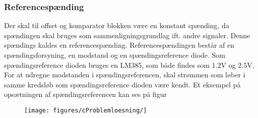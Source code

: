 \subsubsection{Referencespænding}
Der skal til offset og komparator blokken være en konstant spænding, da spændingen skal bruges som sammenligningsgrundlag ift. andre signaler. Denne spændings kaldes en referencespænding. Referencespændingen består af en spændingsforsyning, en modstand og en spændingsreference diode. Som spændingsreference dioden bruges en LM385, som både findes som $1.2$V og $2.5$V. For at udregne modstanden i spændingsreferencen, skal strømmen som løber i samme kredsløb som spændingsreference dioden være kendt. Et eksempel på opsætningen af spændingsreferencen kan ses på figur \figref{}

\begin{figure}[H]
	\centering
	\texttt{[image: figures/cProblemloesning/]}
	\caption{}
	\label{fig:}
\end{figure}

